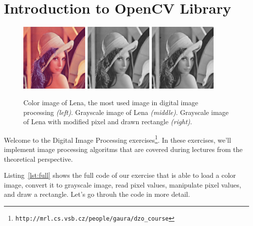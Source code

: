 \documentclass[10pt]{article}
\begin{document}
\section*{Introduction to OpenCV Library}

\begin{figure}[th]
\begin{center}
    \includegraphics[width=0.3\textwidth]{lena} \includegraphics[width=0.3\textwidth]{lena_gray} \includegraphics[width=0.3\textwidth]{gray_8uc1_img} 

    \caption{Color image of Lena, the most used image in digital image processing \textit{(left)}.
    Grayscale image of Lena \textit{(middle)}. Grayscale image of Lena with modified pixel and drawn rectangle \textit{(right)}.}
    \label{img:lena}
\end{center}
\end{figure}

Welcome to the Digital Image Processing exercises\footnote{\texttt{http://mrl.cs.vsb.cz/people/gaura/dzo\_course}}.
In these exercises, we'll implement image processing algoritms that are covered during lectures from the theoretical perspective.

Listing~\ref{lst:full} shows the full code of our exercise that is able to load a color image, convert it to grayscale image, read pixel values,
manipulate pixel values, and draw a rectangle. Let's go throuh the code in more detail.
\end{document}

